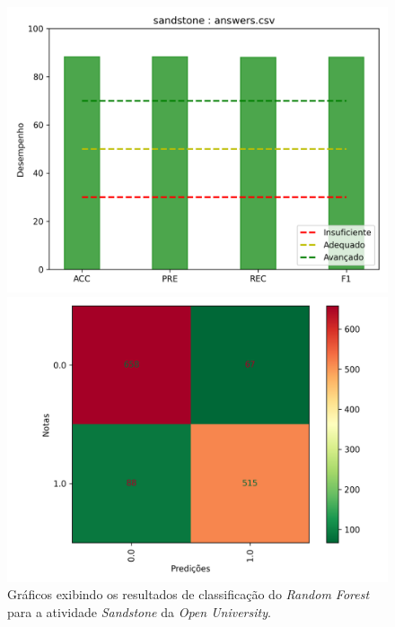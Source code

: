 \begin{figure}[!h]
\begin{minipage}[t]{.5\textwidth}
 \centering
 \includegraphics[width=\textwidth]{figuras/exemplo/sandstone-evalRDF.png}
\end{minipage}
\begin{minipage}[t]{.5\textwidth}
 \centering
 \includegraphics[width=\textwidth]{figuras/exemplo/sandstone-cmRDF.png}
\end{minipage}
\caption{Gráficos exibindo os resultados de classificação do \textit{Random Forest} para a atividade \textit{Sandstone} da \textit{Open University}.}
\label{fig-sandstone-clf}
\end{figure}


